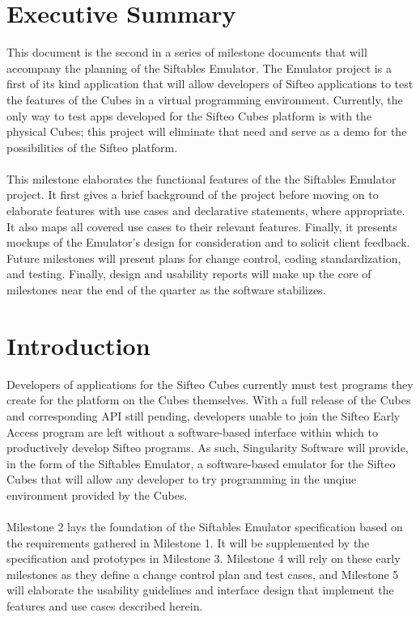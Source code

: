 \documentclass[12pt]{article}
\begin{document}
\section{Executive Summary}
This document is the second in a series of milestone documents that will accompany the planning of the Siftables Emulator. The Emulator project is a first of its kind application that will allow developers of Sifteo applications to test the features of the Cubes in a virtual programming environment. Currently, the only way to test apps developed for the Sifteo Cubes platform is with the physical Cubes; this project will eliminate that need and serve as a demo for the possibilities of the Sifteo platform.\\\\
This milestone elaborates the functional features of the the Siftables Emulator project. It first gives a brief background of the project before moving on to elaborate features with use cases and declarative statements, where appropriate. It also maps all covered use cases to their relevant features. Finally, it presents mockups of the Emulator's design for consideration and to solicit client feedback.  Future milestones will present plans for change control, coding standardization, and testing. Finally, design and usability reports will make up the core of milestones near the end of the quarter as the software stabilizes.


\section{Introduction}
Developers of applications for the \gls{Sifteo Cubes} currently must test programs they create for the platform on the Cubes themselves.  With a full release of the Cubes and corresponding \gls{API} still pending, developers unable to join the Sifteo Early Access program are left without a software-based interface within which to productively develop Sifteo programs. As such, Singularity Software will provide, in the form of the Siftables Emulator, a software-based emulator for the Sifteo Cubes that will allow any developer to try programming in the unqiue environment provided by the Cubes.\\\\
Milestone 2 lays the foundation of the Siftables Emulator specification based on the requirements gathered in Milestone 1. It will be supplemented by the specification and prototypes in Milestone 3. Milestone 4 will rely on these early milestones as they define a change control plan and test cases, and Milestone 5 will elaborate the usability guidelines and interface design that implement the features and use cases described herein.
\end{document}
